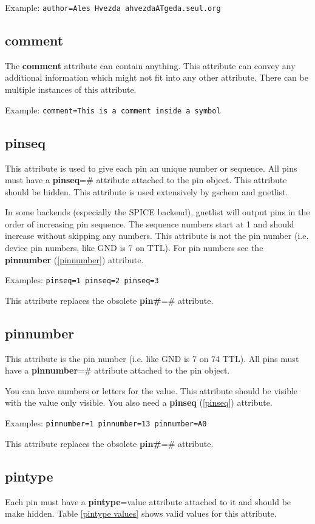 \documentclass{article}
\begin{document}
Example: \texttt{author=Ales Hvezda ahvezdaATgeda.seul.org}


\subsection{\bf comment\label{comment}}
The {\bf comment} attribute can contain anything.  This attribute can
convey any additional information which might not fit into any other
attribute.  There can be multiple instances of this attribute.

Example: \texttt{comment=This is a comment inside a symbol}


\subsection{\bf pinseq\label{pinseq}}
This attribute is used to give each pin an unique number or sequence.
All pins must have a {\bf pinseq}=\# attribute attached to the pin object.
This attribute should be hidden.  This attribute is used extensively by
gschem and gnetlist.

In some backends (especially the SPICE backend), gnetlist will output
pins in the order of increasing pin sequence.  The sequence numbers start
at 1 and should increase without skipping any numbers.  This attribute
is not the pin number (i.e. device pin numbers, like GND is 7 on TTL).
For pin numbers see the {\bf pinnumber} (\ref{pinnumber}) attribute.

Examples: \texttt{pinseq=1 pinseq=2 pinseq=3}

This attribute replaces the obsolete {\bf pin\#}=\# attribute.


\subsection{\bf pinnumber\label{pinnumber}}
This attribute is the pin number (i.e. like GND is 7 on 74 TTL).  
All pins must have a {\bf pinnumber}=\# attribute attached to the pin object.

You can have numbers or letters for the value.  This attribute should
be visible with the value only visible.  You also need a {\bf pinseq}
(\ref{pinseq}) attribute.

Examples: \texttt{pinnumber=1 pinnumber=13 pinnumber=A0}   

This attribute replaces the obsolete {\bf pin\#}=\# attribute.


\subsection{\bf pintype\label{pintype}}
Each pin must have a {\bf pintype}=value attribute attached to it and 
should be make hidden. Table \ref{pintype values} shows valid values for
this attribute.  
\end{document}
